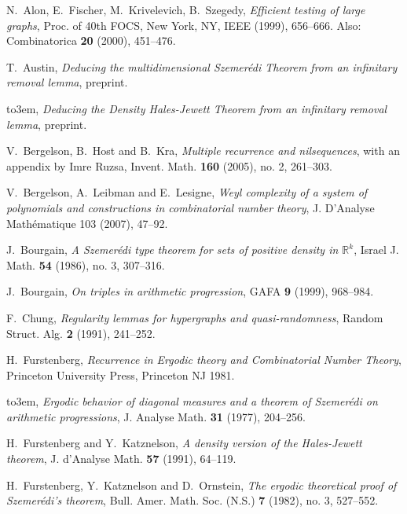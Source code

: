 \documentclass[11pt,reqno]{amsart}
\numberwithin{equation}{section}
\theoremstyle{plain}
\theoremstyle{definition}
\newcommand\R{\mathbb{R}}
\newcommand\1{{\bf 1}}
\newcommand\2{{\bf 2}}
\begin{document}
\providecommand{\bysame}{\leavevmode\hbox to3em{\hrulefill}\thinspace}
\begin{thebibliography}{99}

N.~Alon, E.~Fischer, M.~Krivelevich, B.~Szegedy, \emph{Efficient
testing of large graphs}, Proc. of 40th FOCS, New York, NY, IEEE (1999), 656--666. Also: Combinatorica \textbf{20} (2000), 451--476.

T.~Austin, \emph{Deducing the multidimensional Szemer\'edi Theorem from an infinitary removal lemma}, preprint.

\bysame, \emph{Deducing the Density Hales-Jewett Theorem from an infinitary removal lemma}, preprint.

V.~Bergelson, B.~Host and B.~Kra, \emph{Multiple recurrence and nilsequences}, with an appendix by Imre Ruzsa, Invent. Math. \textbf{160} (2005), no. 2, 261--303.

V.~Bergelson, 	A.~Leibman and E.~Lesigne, \emph{Weyl complexity of a system of polynomials and constructions in combinatorial number theory}, J. D'Analyse Math\'ematique 103 (2007), 47--92. 

J.~Bourgain, \emph{A Szemer\'edi type theorem for sets of positive density in $\R^k$}, {Israel J. Math.} \textbf{54} (1986), no. 3, 307--316.

J.~Bourgain, \emph{On triples in arithmetic progression}, {GAFA } \textbf{9} (1999), 968--984.

F.~Chung, \emph{Regularity lemmas for hypergraphs and quasi-randomness}, Random Struct. Alg. \textbf{2} (1991), 241--252.

H.~Furstenberg, {\it Recurrence in Ergodic theory and Combinatorial Number Theory}, Princeton University Press, Princeton NJ 1981.

 \bysame,
\emph{Ergodic behavior of diagonal measures and a theorem of Szemer\'edi on arithmetic progressions},
J. Analyse Math. \textbf{31} (1977), 204--256.

H.~Furstenberg and Y.~Katznelson, \emph{A density version of the Hales-Jewett theorem}, J. d'Analyse Math. \textbf{57} (1991), 64--119.

 H.~Furstenberg, Y.~Katznelson and D.~Ornstein,
\emph{The ergodic theoretical proof of Szemer\'edi's theorem},
Bull. Amer. Math. Soc. (N.S.) \textbf{7} (1982), no. 3, 527--552.


\end{thebibliography}
\end{document}
